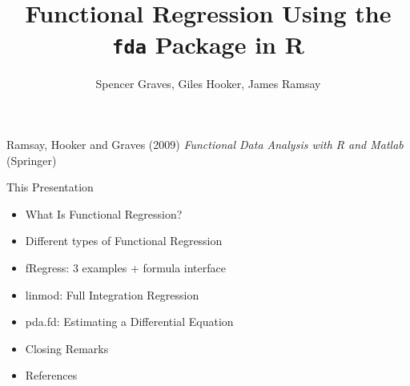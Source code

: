 \documentclass[compress]{beamer}
\begin{document}

\title{
Functional Regression \newline
Using the \texttt{fda} Package in R}
\author{Spencer Graves, Giles Hooker, James Ramsay}

\date{}

\begin{frame}

\maketitle

Ramsay, Hooker and Graves (2009)
\emph{Functional Data Analysis with R and Matlab}
(Springer)

\end{frame}

\begin{frame}{This Presentation}

\begin{itemize}
    \item What Is Functional Regression?

    \item Different types of Functional Regression

    \item fRegress:  3 examples + formula interface

    \item linmod:  Full Integration Regression

    \item pda.fd:  Estimating a Differential Equation

    \item Closing Remarks

    \item References

\end{itemize}

\end{frame}

\end{document}
